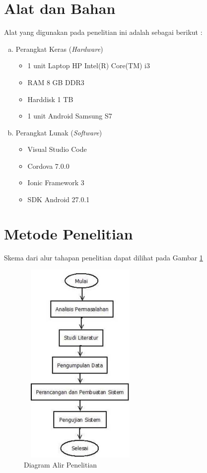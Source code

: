 \section{Alat dan Bahan}
Alat yang digunakan pada penelitian ini adalah sebagai berikut :

\begin{enumerate}[a.]
\item Perangkat Keras (\textit{Hardware})
	\begin{itemize}
		\item 1 unit Laptop HP Intel(R) Core(TM) i3
		\item RAM 8 GB DDR3
		\item Harddisk 1 TB
		\item 1 unit Android Samsung S7
	\end{itemize}

\item Perangkat Lunak (\textit{Software})
	\begin{itemize}
		\item Visual Studio Code
		\item Cordova 7.0.0
		\item Ionic Framework 3
		\item SDK Android 27.0.1
	\end{itemize}
\end{enumerate}

\section{Metode Penelitian}
Skema dari alur tahapan penelitian dapat dilihat pada Gambar \ref{alur}
\vspace{-0.4cm}
\begin{figure}[H]
	\center
	\includegraphics [width = 6cm, height= 10cm]{gambar/alur2}
	\caption{Diagram Alir Penelitian}
	\label{alur}
\end{figure}

